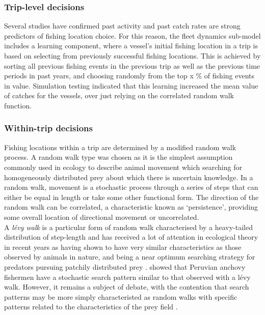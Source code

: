 \documentclass[review]{elsarticle}
\begin{document}
\subsubsection{Trip-level decisions}

Several studies \citep[e.g.][]{Hutton2004, Tidd2012, Girardin2015} have confirmed
past activity and past catch rates are strong predictors of fishing location
choice. For this reason, the fleet dynamics sub-model includes a learning
component, where a vessel's initial fishing location in a trip is based on
selecting from previously successful fishing locations. This is achieved by
sorting all previous fishing events in the previous trip as well as the
previous time periods in past years, and choosing randomly from the top x \% of
fishing events in value.  Simulation testing indicated that this learning
increased the mean value of catches for the vessels, over just relying on the
correlated random walk function. 

\subsubsection{Within-trip decisions}

Fishing locations within a trip are determined by a modified random walk
process. A random walk type was chosen as it is the simplest assumption
commonly used in ecology to describe animal movement which searching for
homogeneously distributed prey about which there is uncertain knowledge. In a
random walk, movement is a stochastic process through a series of steps that
can either be equal in length or take some other functional form.  The
direction of the random walk can be correlated, a characteristic known as
`persistence', providing some overall location of directional movement
\citep{Codling2008} or uncorrelated. \\

A \textit{lévy walk} is a particular form of random walk characterised by a
heavy-tailed distribution of step-length and has received a lot of attention in
ecological theory in recent years as having shown to have very similar
characteristics as those observed by animals in nature, and being a near
optimum searching strategy for predators pursuing patchily distributed prey
\citep{Bartumeus2005, Sims2008}.  \citet{Bertrand2007} showed that Peruvian
anchovy fishermen have a stochastic search pattern similar to that observed
with a lévy walk. However, it remains a subject of debate, with the contention
that search patterns may be more simply characteristed as random walks
\citep{Sakiyama2013} with specific patterns related to the characteristics of
the prey field \citep{Sims2012}. \\
\end{document}
